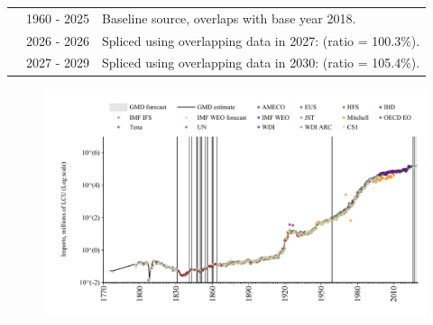 \documentclass[12pt,a4paper,landscape]{article}
\begin{document}
\begin{adjustbox}{max totalsize={\paperwidth}{\paperheight},center}
\begin{minipage}[t][\textheight][t]{\textwidth}
\begin{table}[H]
\begin{tabular}{|l|l|l|}
\rowcolor{lightgray}\cite{OECD_EO}& 1960 - 2025 &Baseline source, overlaps with base year 2018.\\
\rowcolor{white}\cite{AMECO}& 2026 - 2026 &Spliced using overlapping data in 2027: (ratio = 100.3\%).\\
\rowcolor{lightgray}\cite{IMF_WEO_forecast}& 2027 - 2029 &Spliced using overlapping data in 2030: (ratio = 105.4\%).\\
\hline
\end{tabular}
\end{table}
\begin{figure}[H]
\centering
\includegraphics[width=\textwidth,height=0.6\textheight,keepaspectratio]{graphs/PRT_imports.pdf}
\end{figure}
\end{minipage}
\end{adjustbox}
\end{document}
